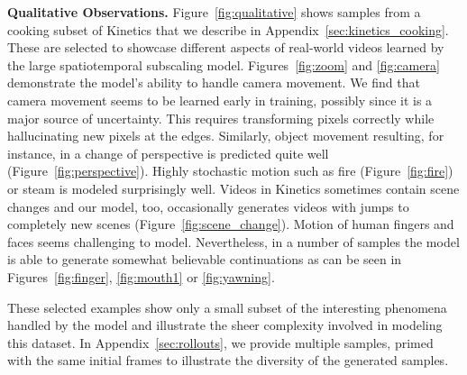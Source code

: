 \documentclass{article} \usepackage{iclr2020_conference,times}
\begin{document}
\textbf{Qualitative Observations.} Figure~\ref{fig:qualitative} shows samples from a cooking subset of Kinetics that we describe in Appendix~\ref{sec:kinetics_cooking}. These are selected to showcase different aspects of real-world videos learned by the large spatiotemporal subscaling model. Figures~\ref{fig:zoom} and \ref{fig:camera} demonstrate the model's ability to handle camera movement. We find that camera movement seems to be learned early in training, possibly since it is a major source of uncertainty. This requires transforming pixels correctly while hallucinating new pixels at the edges. Similarly, object movement resulting, for instance, in a change of perspective is predicted quite well (Figure~\ref{fig:perspective}). Highly stochastic motion such as fire (Figure~\ref{fig:fire}) or steam is modeled surprisingly well.
Videos in Kinetics sometimes contain scene changes and our model, too, occasionally generates videos with jumps to completely new scenes (Figure~\ref{fig:scene_change}).
Motion of human fingers and faces seems challenging to model. Nevertheless, in a number of samples the model is able to generate somewhat believable continuations as can be seen in Figures~\ref{fig:finger}, \ref{fig:mouth1} or \ref{fig:yawning}.

These selected examples show only a small subset of the interesting phenomena handled by the model and illustrate the sheer complexity involved in modeling this dataset. In Appendix~\ref{sec:rollouts}, we provide multiple samples, primed with the same initial frames to illustrate the diversity of the generated samples.
\end{document}
